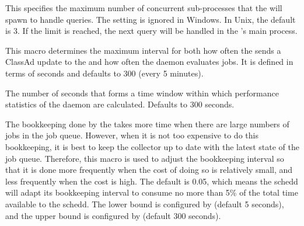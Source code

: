 \begin{description}
\label{param:ScheddQueryWorkers}
\item[\Macro{SCHEDD\_QUERY\_WORKERS}]
  This specifies the maximum number of concurrent sub-processes that
  the  will spawn to handle queries.  The setting is
  ignored in Windows.  In Unix, the default is 3.  If the limit is
  reached, the next query will be handled in the 's main
  process.

\label{param:ScheddInterval}
\item[\Macro{SCHEDD\_INTERVAL}]
  This macro determines the maximum interval for both how often the
   sends a ClassAd update to the  and
  how often the  daemon evaluates jobs.  It is defined
  in terms of seconds and defaults to 300 (every 5 minutes).

\label{param:WindowedStatWidth}
\item[\Macro{WINDOWED\_STAT\_WIDTH}]
  The number of seconds that forms a time window within which performance
  statistics of the  daemon are calculated.
  Defaults to 300 seconds.

\label{param:ScheddIntervalTimeslice}
\item[\Macro{SCHEDD\_INTERVAL\_TIMESLICE}]
  The bookkeeping done by the
   takes more time when there are large numbers of jobs
  in the job queue.  However, when it is not too expensive to do this
  bookkeeping, it is best to keep the collector up to date with the
  latest state of the job queue.  Therefore, this macro is used to
  adjust the bookkeeping interval so that it is done more frequently
  when the cost of doing so is relatively small, and less frequently
  when the cost is high.  The default is 0.05, which means the schedd
  will adapt its bookkeeping interval to consume no more than 5\% of the
  total time available to the schedd.  The lower bound is configured by
   (default 5 seconds), and the upper bound
  is configured by  (default 300 seconds).




\end{description}
